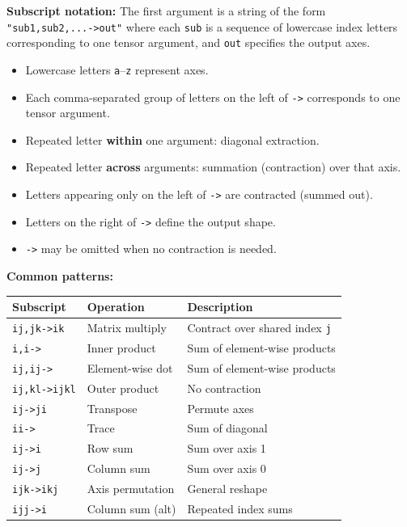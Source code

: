 \textbf{Subscript notation:}
The first argument is a string of the form \texttt{"sub1,sub2,...->out"} where each \texttt{sub} is a sequence of lowercase index letters corresponding to one tensor argument, and \texttt{out} specifies the output axes.
\begin{itemize}
\item Lowercase letters \texttt{a}--\texttt{z} represent axes.
\item Each comma-separated group of letters on the left of \texttt{->} corresponds to one tensor argument.
\item Repeated letter \textbf{within} one argument: diagonal extraction.
\item Repeated letter \textbf{across} arguments: summation (contraction) over that axis.
\item Letters appearing only on the left of \texttt{->} are contracted (summed out).
\item Letters on the right of \texttt{->} define the output shape.
\item \texttt{->} may be omitted when no contraction is needed.
\end{itemize}

\textbf{Common patterns:}
\begin{center}
\begin{tabular}{|l|l|l|}
\hline
\textbf{Subscript} & \textbf{Operation} & \textbf{Description} \\
\hline
\texttt{ij,jk->ik} & Matrix multiply & Contract over shared index \texttt{j} \\
\texttt{i,i->} & Inner product & Sum of element-wise products \\
\texttt{ij,ij->} & Element-wise dot & Sum of element-wise products \\
\texttt{ij,kl->ijkl} & Outer product & No contraction \\
\texttt{ij->ji} & Transpose & Permute axes \\
\texttt{ii->} & Trace & Sum of diagonal \\
\texttt{ij->i} & Row sum & Sum over axis 1 \\
\texttt{ij->j} & Column sum & Sum over axis 0 \\
\texttt{ijk->ikj} & Axis permutation & General reshape \\
\texttt{ijj->i} & Column sum (alt) & Repeated index sums \\
\hline
\end{tabular}
\end{center}

